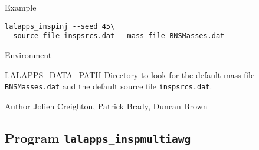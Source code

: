\begin{entry}
\item[Example]
\begin{verbatim}
lalapps_inspinj --seed 45\
--source-file inspsrcs.dat --mass-file BNSMasses.dat
\end{verbatim}

\item[Environment]\leavevmode
\begin{entry}
\item[LALAPPS\_DATA\_PATH] Directory to look for the default mass
file \verb+BNSMasses.dat+ and the default source file \verb+inspsrcs.dat+.
\end{entry}


\item[Author] 
Jolien Creighton, Patrick Brady, Duncan Brown
\end{entry}







%
% 
\clearpage
\subsection{Program \texttt{lalapps\_inspmultiawg}}
\label{program:lalapps-inspmultiawg}

